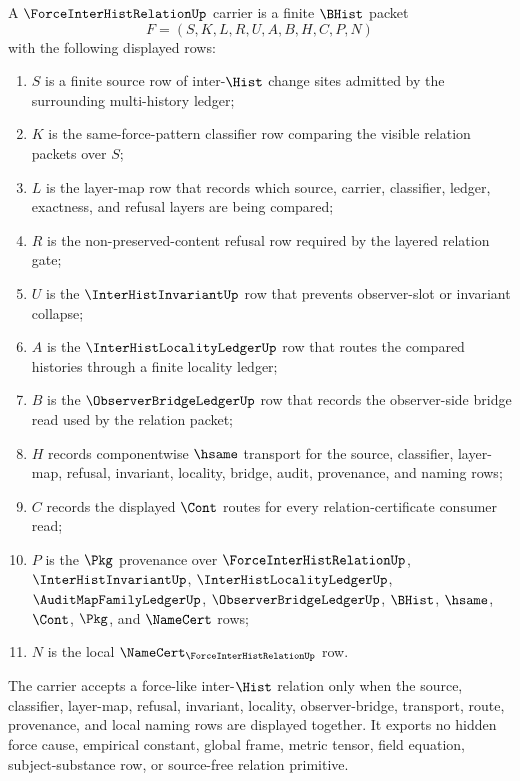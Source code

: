 \begin{definition}
\label{def:force-interhist-relation-carrier}
A $\ForceInterHistRelationUp$ carrier is a finite $\BHist$ packet
$$
F=(S,K,L,R,U,A,B,H,C,P,N)
$$
with the following displayed rows:
\begin{enumerate}
\item $S$ is a finite source row of inter-$\Hist$ change sites admitted by the surrounding multi-history ledger;
\item $K$ is the same-force-pattern classifier row comparing the visible relation packets over $S$;
\item $L$ is the layer-map row that records which source, carrier, classifier, ledger, exactness, and refusal layers are being compared;
\item $R$ is the non-preserved-content refusal row required by the layered relation gate;
\item $U$ is the $\InterHistInvariantUp$ row that prevents observer-slot or invariant collapse;
\item $A$ is the $\InterHistLocalityLedgerUp$ row that routes the compared histories through a finite locality ledger;
\item $B$ is the $\ObserverBridgeLedgerUp$ row that records the observer-side bridge read used by the relation packet;
\item $H$ records componentwise $\hsame$ transport for the source, classifier, layer-map, refusal, invariant, locality, bridge, audit, provenance, and naming rows;
\item $C$ records the displayed $\Cont$ routes for every relation-certificate consumer read;
\item $P$ is the $\Pkg$ provenance over $\ForceInterHistRelationUp$, $\InterHistInvariantUp$, $\InterHistLocalityLedgerUp$, $\AuditMapFamilyLedgerUp$, $\ObserverBridgeLedgerUp$, $\BHist$, $\hsame$, $\Cont$, $\Pkg$, and $\NameCert$ rows;
\item $N$ is the local $\NameCert_{\ForceInterHistRelationUp}$ row.
\end{enumerate}
The carrier accepts a force-like inter-$\Hist$ relation only when the source, classifier, layer-map, refusal, invariant, locality, observer-bridge, transport, route, provenance, and local naming rows are displayed together. It exports no hidden force cause, empirical constant, global frame, metric tensor, field equation, subject-substance row, or source-free relation primitive.
\end{definition}

